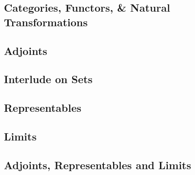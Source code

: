 \documentclass{article}
\begin{document}
  \begin{multicols}{2}
    \noindent\subsection*{Categories, Functors, \& Natural Transformations}
    
    
    
    \noindent\subsection*{Adjoints}
    
    
    
    \noindent\subsection*{Interlude on Sets}
    
    \noindent\subsection*{Representables}
    
    
    
    \noindent\subsection*{Limits}
    
    
    
    \noindent\subsection*{Adjoints, Representables and Limits}
    
  \end{multicols}
\end{document}

